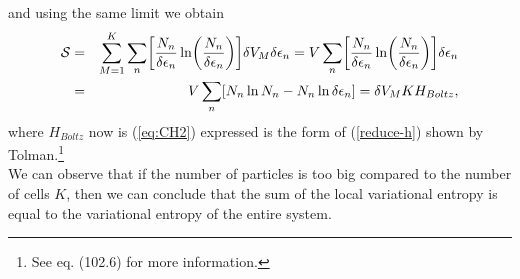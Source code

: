 and using the same limit we obtain
\begin{eqnarray}
    \Ss&=& \sum_{M=1}^{K} \sum_n
    \left[  
           \frac{N_{n}}{ \delta \epsilon_{n}} \ln 
           \left( 
                  \frac{N_{n}}{ \delta \epsilon_{n}}
           \right)
    \right]  \de V_M \delta \epsilon_{n} = V \sum_n
    \left[  
           \frac{N_{n}}{ \delta \epsilon_{n}} \ln 
           \left( 
                  \frac{N_{n}}{ \delta \epsilon_{n}}
           \right)
    \right] \delta \epsilon_{n} \nonumber \\
    &=& V \sum_n \left[N_n \ln N_n - N_n \ln \delta \epsilon_n  \right]=\de V_M K H_{Boltz},\label{h-quantic4}
\end{eqnarray}
where $H_{Boltz}$ now is (\ref{eq:CH2}) expressed is the form of (\ref{reduce-h}) shown by Tolman.\footnote{See \cite{bib:tolman} eq. (102.6) for more information.}\\
We can observe that if the number of particles is too big compared to the number of cells $K$, then we can conclude that the sum of the local variational entropy is equal to the variational entropy of the entire system.\\

